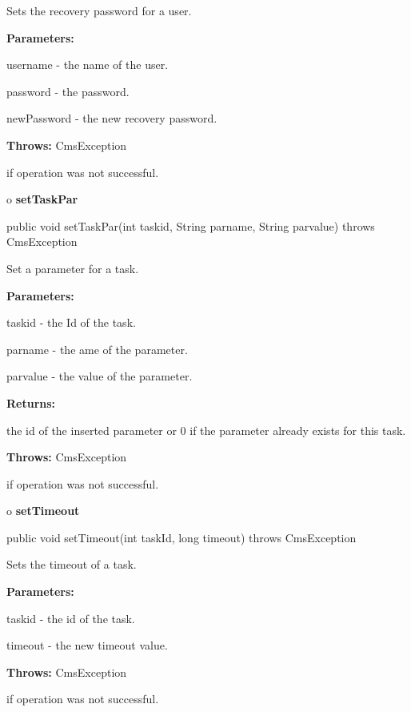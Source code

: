\begin{description}
\htmlDD Sets the recovery password for a user.

\begin{description}
\item {\bf Parameters:}

username - the name of the user.

password - the password.

newPassword - the new recovery password.
\item {\bf Throws:} CmsException

if operation was not successful.
\end{description}

\end{description}

o {\bf setTaskPar}

\begin{PRE}
 public void setTaskPar(int taskid,
                        String parname,
                        String parvalue) throws CmsException
\end{PRE}

\begin{description}
\htmlDD Set a parameter for a task.

\begin{description}
\item {\bf Parameters:}

taskid - the Id of the task.

parname - the ame of the parameter.

parvalue - the value of the parameter.
\item {\bf Returns:}

the id of the inserted parameter or 0 if the parameter already exists for this
task.
\item {\bf Throws:} CmsException

if operation was not successful.
\end{description}

\end{description}

o {\bf setTimeout}

\begin{PRE}
 public void setTimeout(int taskId,
                        long timeout) throws CmsException
\end{PRE}

\begin{description}
\htmlDD Sets the timeout of a task.

\begin{description}
\item {\bf Parameters:}

taskid - the id of the task.

timeout - the new timeout value.
\item {\bf Throws:} CmsException

if operation was not successful.
\end{description}

\end{description}

